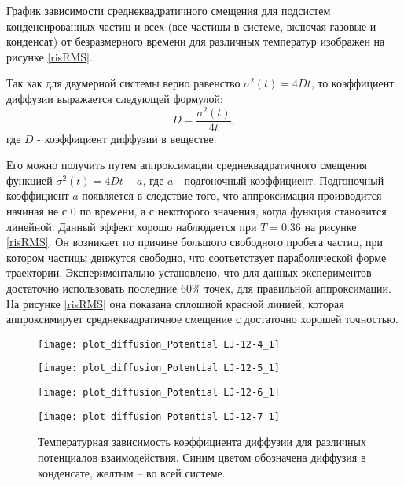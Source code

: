 График зависимости среднеквадратичного смещения для подсистем конденсированных частиц и всех (все частицы в системе, включая газовые и конденсат) от безразмерного времени для различных температур изображен на рисунке \ref{risRMS}.

Так как для двумерной системы верно равенство $\sigma^2(t) = 4Dt$, то коэффициент диффузии выражается следующей формулой:
\begin{equation}
    D = \frac{\sigma^2(t)}{4t},
    \label{eqD}
\end{equation}
где $D$ - коэффициент диффузии в веществе.

Его можно получить путем аппроксимации среднеквадратичного смещения функцией $\sigma^2(t) = 4Dt + a$, где $a$ - подгоночный коэффициент. Подгоночный коэффициент $a$ появляется в следствие того, что аппроксимация производится начиная не с 0 по времени, а с некоторого значения, когда функция становится линейной. Данный эффект хорошо наблюдается при $T = 0.36$ на рисунке \ref{risRMS}. Он возникает по причине большого свободного пробега частиц, при котором частицы движутся свободно, что соответствует параболической форме траектории. Экспериментально установлено, что для данных экспериментов достаточно использовать последние $60\%$ точек, для правильной аппроксимации. 
На рисунке \ref{risRMS} она показана сплошной красной линией, которая аппроксимирует среднеквадратичное смещение с достаточно хорошей точностью.

\begin{figure}[h]
\begin{center}
\begin{minipage}[h]{0.45\linewidth}
\texttt{[image: plot\_diffusion\_Potential LJ-12-4\_1]}
\end{minipage}
\begin{minipage}[h]{0.45\linewidth}
\texttt{[image: plot\_diffusion\_Potential LJ-12-5\_1]}
\end{minipage}
\begin{minipage}[h]{0.45\linewidth}
\texttt{[image: plot\_diffusion\_Potential LJ-12-6\_1]}
\end{minipage}
\begin{minipage}[h]{0.45\linewidth}
\texttt{[image: plot\_diffusion\_Potential LJ-12-7\_1]}
\end{minipage}
\caption{Температурная зависимость коэффициента диффузии для различных потенциалов взаимодействия. Синим цветом обозначена диффузия в конденсате, желтым -- во всей системе.}
\label{risD}
\end{center}
\end{figure}

